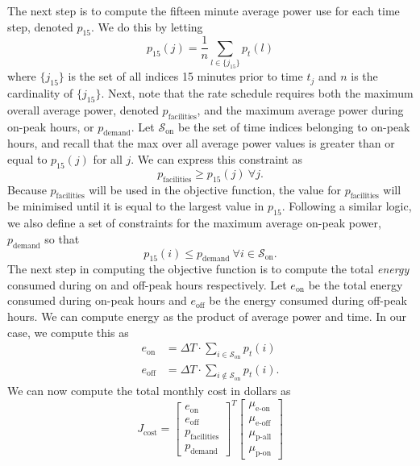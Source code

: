 \par The next step is to compute the fifteen minute average power use for each time step, denoted $p_{\text{15}}$. We do this by letting 
\begin{equation}\label{eqn:objective:p15}
p_{\text{15}}(j) = \frac{1}{n}\sum_{l \in \{j_{15}\}}p_t(l)
\end{equation}
where $\{j_{15}\}$ is the set of all indices 15 minutes prior to time $t_j$ and $n$ is the cardinality of $\{j_{15}\}$.
Next, note that the rate schedule requires both the maximum overall average power, denoted $p_{\text{facilities}}$, and the maximum average power during on-peak hours, or $p_{\text{demand}}$. Let $\mathcal{S}_{\text{on}}$ be the set of time indices belonging to on-peak hours, and recall that the max over all average power values is greater than or equal to $p_{15}(j)$ for all $j$. We can express this constraint as
\begin{equation}\label{eqn:objective:pFac}
	p_{\text{facilities}} \ge p_{15}(j) \ \forall j.
\end{equation}
Because $p_{\text{facilities}}$ will be used in the objective function, the value for $p_{\text{facilities}}$ will be minimised until it is equal to the largest value in $p_{15}$. Following a similar logic, we also define a set of constraints for the maximum average on-peak power, $p_{\text{demand}}$ so that
\begin{equation}\label{eqn:objective:pDem}
	p_{15}(i) \leq p_{\text{demand}} \ \forall i \in \mathcal{S}_{\text{on}}.
\end{equation}
The next step in computing the objective function is to compute the total {\it energy} consumed during on and off-peak hours respectively.  Let $e_{\text{on}}$ be the total energy consumed during on-peak hours and $e_{\text{off}}$ be the energy consumed during off-peak hours. We can compute energy as the product of average power and time.  In our case, we compute this as 
\begin{equation}\label{eqn:objective:energy}\begin{aligned}
	e_{\text{on}} &= \Delta T\cdot \sum_{i \in \mathcal{S}_{\text{on}}}p_t(i) \\ 
	e_{\text{off}} &= \Delta T\cdot \sum_{i \notin \mathcal{S}_{\text{on}}}p_t(i).  
\end{aligned}\end{equation}
We can now compute the total monthly cost in dollars as
\begin{equation}\label{sec:unconstrainedSchedule:objective}
J_{\text{cost}} = \begin{bmatrix}e_{\text{on}} \\ e_{\text{off}} \\ p_{\text{facilities}} \\ p_{\text{demand}} \end{bmatrix}^T \begin{bmatrix} \mu_{\text{e-on}} \\ \mu_{\text{e-off}} \\ \mu_{\text{p-all}} \\ \mu_{\text{p-on}} \end{bmatrix} 
\end{equation}

